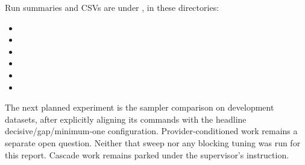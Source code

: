 \documentclass[11pt]{article}
\begin{document}
Run summaries and CSVs are under , in these directories:
\begin{itemize}\small
\item {}
\item {}
\item {}
\item {}
\item {}
\item {}
\end{itemize}

The next planned experiment is the sampler comparison on development datasets,
after explicitly aligning its commands with the headline decisive/gap/minimum-one
configuration. Provider-conditioned work remains a separate open question.
Neither that sweep nor any blocking tuning was run for this report. Cascade work
remains parked under the supervisor's instruction.
\end{document}
